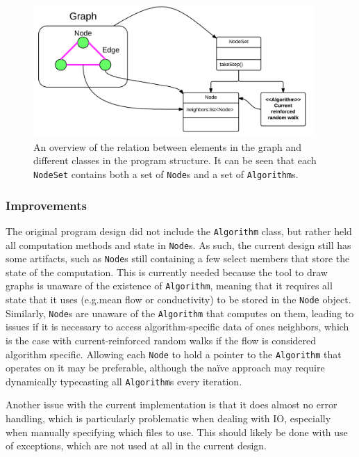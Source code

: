 \begin{figure}[H]
\centering
\includegraphics[width=0.95\textwidth]{img/graphToClass.png}
\caption{An overview of the relation between elements in the graph and different classes in the program structure. It can be seen that each \texttt{NodeSet} contains both a set of \texttt{Node}s and a set of \texttt{Algorithm}s.}
\label{fig:graphToClass}
\end{figure}

\subsubsection{Improvements}

The original program design did not include the \texttt{Algorithm} class, but rather held all computation methods and state in \texttt{Node}s. As such, the current design still has some artifacts, such as \texttt{Node}s still containing a few select members that store the state of the computation. This is currently needed because the tool to draw graphs is unaware of the existence of \texttt{Algorithm}, meaning that it requires all state that it uses (e.g.\@ mean flow or conductivity) to be stored in the \texttt{Node} object. Similarly, \texttt{Node}s are unaware of the \texttt{Algorithm} that computes on them, leading to issues if it is necessary to access algorithm-specific data of ones neighbors, which is the case with current-reinforced random walks if the flow is considered algorithm specific. Allowing each \texttt{Node} to hold a pointer to the \texttt{Algorithm} that operates on it may be preferable, although the na\"{i}ve approach may require dynamically typecasting all \texttt{Algorithm}s every iteration.

Another issue with the current implementation is that it does almost no error handling, which is particularly problematic when dealing with IO, especially when manually specifying which files to use. This should likely be done with use of exceptions, which are not used at all in the current design.

